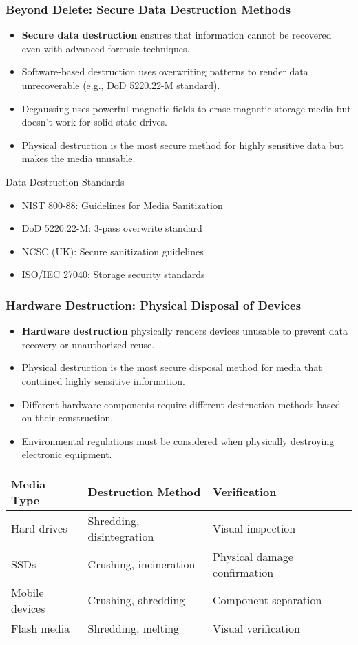 \documentclass{beamer}
\begin{document}
\begin{frame}
\frametitle{Beyond Delete: Secure Data Destruction Methods}
\begin{itemize}
\item \textbf{Secure data destruction} ensures that information cannot be recovered even with advanced forensic techniques.
\item Software-based destruction uses overwriting patterns to render data unrecoverable (e.g., DoD 5220.22-M standard).
\item Degaussing uses powerful magnetic fields to erase magnetic storage media but doesn't work for solid-state drives.
\item Physical destruction is the most secure method for highly sensitive data but makes the media unusable.
\end{itemize}

\begin{block}{Data Destruction Standards}
\begin{itemize}
    \item NIST 800-88: Guidelines for Media Sanitization
    \item DoD 5220.22-M: 3-pass overwrite standard
    \item NCSC (UK): Secure sanitization guidelines
    \item ISO/IEC 27040: Storage security standards
\end{itemize}
\end{block}
\end{frame}

\begin{frame}
\frametitle{Hardware Destruction: Physical Disposal of Devices}
\begin{itemize}
\item \textbf{Hardware destruction} physically renders devices unusable to prevent data recovery or unauthorized reuse.
\item Physical destruction is the most secure disposal method for media that contained highly sensitive information.
\item Different hardware components require different destruction methods based on their construction.
\item Environmental regulations must be considered when physically destroying electronic equipment.
\end{itemize}

\begin{table}
    \scriptsize
\begin{tabular}{|l|l|l|}
\hline
\textbf{Media Type} & \textbf{Destruction Method} & \textbf{Verification} \\
\hline
Hard drives & Shredding, disintegration & Visual inspection \\
SSDs & Crushing, incineration & Physical damage confirmation \\
Mobile devices & Crushing, shredding & Component separation \\
Flash media & Shredding, melting & Visual verification \\
\hline
\end{tabular}
\end{table}
\end{frame}
\end{document}

